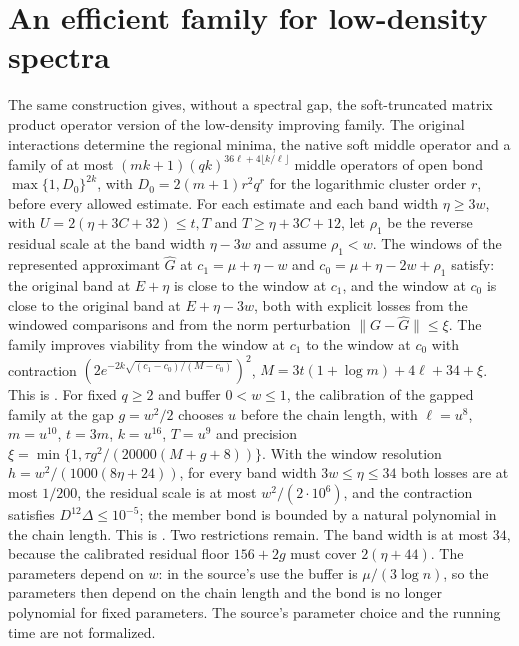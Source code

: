 \documentclass{article}
\begin{document}
\section{An efficient family for low-density spectra}
The same construction gives, without a spectral gap, the soft-truncated
matrix product operator version of the low-density improving family. The
original interactions determine the regional minima, the native soft middle
operator and a family of at most $(mk+1)(qk)^{36\ell+4\lfloor k/\ell\rfloor}$
middle operators of open bond $\max\{1,D_0\}^{2k}$, with
$D_0=2(m+1)r^2q^r$ for the logarithmic cluster order $r$, before every
allowed estimate. For each estimate and each band width $\eta\geq3w$, with
$U=2(\eta+3C+32)\leq t,T$ and $T\geq\eta+3C+12$, let $\rho_1$ be the reverse
residual scale at the band width $\eta-3w$ and assume $\rho_1<w$. The windows
of the represented approximant $\widehat G$ at $c_1=\mu+\eta-w$ and
$c_0=\mu+\eta-2w+\rho_1$ satisfy: the original band at $E+\eta$ is close to the
window at $c_1$, and the window at $c_0$ is close to the original band at
$E+\eta-3w$, both with explicit losses from the windowed comparisons and
from the norm perturbation $\|G-\widehat G\|\leq\xi$. The family improves
viability from the window at $c_1$ to the window at $c_0$ with contraction
$(2e^{-2k\sqrt{(c_1-c_0)/(M-c_0)}})^2$, $M=3t(1+\log m)+4\ell+34+\xi$. This is
.
For fixed $q\geq2$ and buffer $0<w\leq1$, the calibration of the gapped family
at the gap $g=w^2/2$ chooses $u$ before the chain length, with $\ell=u^8$,
$m=u^{10}$, $t=3m$, $k=u^{16}$, $T=u^9$ and precision
$\xi=\min\{1,\tau g^2/(20000(M+g+8))\}$. With the window resolution
$h=w^2/(1000(8\eta+24))$, for every band width $3w\leq\eta\leq34$ both losses are at
most $1/200$, the residual scale is at most $w^2/(2\cdot10^6)$, and the
contraction satisfies $D^{12}\Delta\leq10^{-5}$; the member bond is bounded by a
natural polynomial in the chain length. This is
.
Two restrictions remain. The band width is at most $34$, because the
calibrated residual floor $156+2g$ must cover $2(\eta+44)$. The parameters
depend on $w$: in the source's use the buffer is $\mu/(3\log n)$, so the
parameters then depend on the chain length and the bond is no longer polynomial
for fixed parameters. The source's parameter choice and the running time are
not formalized.
\end{document}
